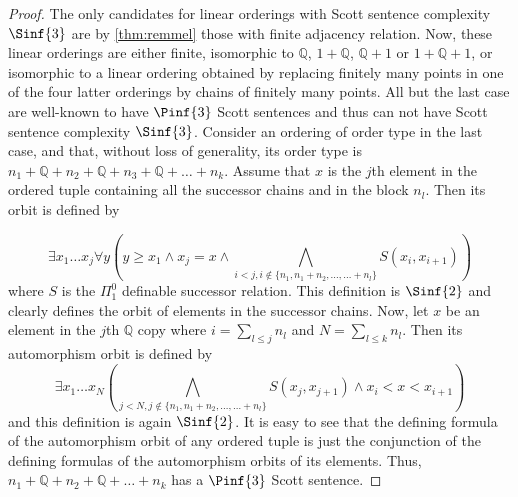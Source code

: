 \documentclass{amsart}
\newcommand{\Q}{\mathbb{Q}}
\begin{document}
\begin{proof}
  The only candidates for linear orderings with Scott sentence complexity
  $\Sinf{3}$ are by \cref{thm:remmel} those with finite adjacency relation. Now,
  these linear orderings are either finite, isomorphic to $\Q$, $1+\Q$,
  $\Q+1$ or $1+\Q+1$, or isomorphic to a linear ordering obtained by
  replacing finitely many points in one of the four latter orderings by chains
  of finitely many points. All but the last case are well-known to have
  $\Pinf{3}$ Scott sentences and thus can not have Scott sentence complexity
  $\Sinf{3}$. Consider an ordering of order type in the last case, and that,
  without loss of generality, its order type is $n_1+\Q+n_2+\Q+n_3+\Q+\dots+n_k$. Assume that
  $x$ is the $j$th element in the ordered tuple containing all the successor
  chains and in the block $n_l$. Then its orbit is defined by

  \[\exists x_1\dots x_{j}\forall y\left(y\geq x_1\land x_{j}=x \land \bigwedge_{i<j,i\not\in \{
    n_1,n_1+n_2,\dots,\dots+n_l\}} S(x_i,x_{i+1})\right)\]
  where $S$ is the $\Pi^0_1$ definable successor relation. This definition is
  $\Sinf{2}$ and clearly defines the orbit of elements in the successor chains.
  Now, let $x$ be an element in the $j$th $\Q$ copy where $i=\sum_{l\leq j}
  n_l$ and $N=\sum_{l\leq k} n_l$. Then its automorphism
  orbit is defined by
  \[ \exists x_1\dots x_{N}\left(\bigwedge_{j<N, j\not\in \{
  n_1,n_1+n_2,\dots,\dots+n_l\}} S(x_j,x_{j+1}) \land x_{i}<x<x_{i+1}\right)\]
  and this definition is again $\Sinf{2}$. It is easy to see that the
  defining formula of the automorphism orbit of any ordered tuple is just the
  conjunction of the defining formulas of the automorphism orbits of its
  elements. Thus, $n_1+\Q+n_2+\Q+\dots+n_k$ has a $\Pinf{3}$ Scott sentence.
\end{proof}
\end{document}
